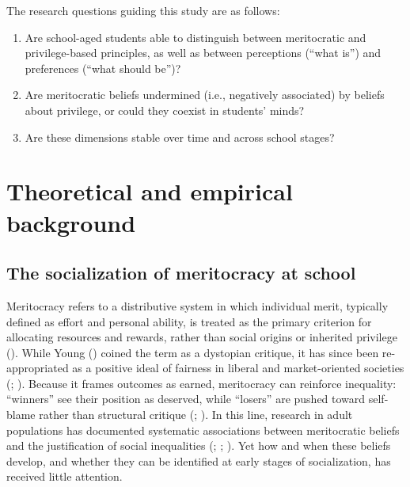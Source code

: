 \documentclass[
  11pt,
]{article}
\begin{document}
The research questions guiding this study are as follows:

\begin{enumerate}
\def\labelenumi{(\arabic{enumi})}
\item
  Are school-aged students able to distinguish between meritocratic and
  privilege-based principles, as well as between perceptions (``what
  is'') and preferences (``what should be'')?
\item
  Are meritocratic beliefs undermined (i.e., negatively associated) by
  beliefs about privilege, or could they coexist in students' minds?
\item
  Are these dimensions stable over time and across school stages?
\end{enumerate}

\section{Theoretical and empirical
background}\label{theoretical-and-empirical-background}

\subsection{The socialization of meritocracy at
school}\label{the-socialization-of-meritocracy-at-school}

Meritocracy refers to a distributive system in which individual merit,
typically defined as effort and personal ability, is treated as the
primary criterion for allocating resources and rewards, rather than
social origins or inherited privilege
(). While Young
() coined the term as a dystopian
critique, it has since been re-appropriated as a positive ideal of
fairness in liberal and market-oriented societies
(;
).
Because it frames outcomes as earned, meritocracy can reinforce
inequality: ``winners'' see their position as deserved, while ``losers''
are pushed toward self-blame rather than structural critique
(;
). In this line,
research in adult populations has documented systematic associations
between meritocratic beliefs and the justification of social
inequalities (;
;
). Yet how and when these beliefs develop, and whether they can be
identified at early stages of socialization, has received little
attention.
\end{document}
